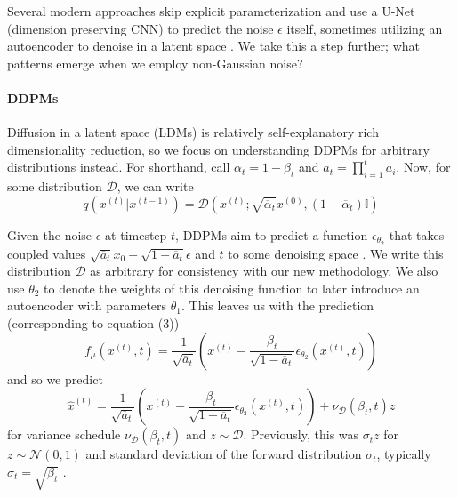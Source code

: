 \documentclass[10pt,twocolumn,letterpaper]{article}
\begin{document}
Several modern approaches \cite{DBLP:journals/corr/abs-2011-13456, DBLP:journals/corr/abs-2006-11239, DBLP:journals/corr/abs-2010-02502,DBLP:journals/corr/abs-2102-09672} skip explicit parameterization and use a U-Net (dimension preserving CNN) \cite{DBLP:journals/corr/RonnebergerFB15} to predict the noise $\epsilon$ itself, sometimes utilizing an autoencoder to denoise in a latent space \cite{DBLP:journals/corr/abs-2112-10752}. We take this a step further; what patterns emerge when we employ non-Gaussian noise?

\paragraph{\textbf{DDPMs}} Diffusion in a latent space (LDMs) is relatively self-explanatory rich dimensionality reduction, so we focus on understanding DDPMs for arbitrary distributions instead. For shorthand, call $\alpha_t=1-\beta_t$ and $\overline{a_t}=\prod_{i=1}^t a_i$. Now, for some distribution $\mathcal{D}$, we can write
\begin{equation}
    q(x^{(t)}|x^{(t-1)})=\mathcal{D}(x^{(t)};\sqrt{\overline{\alpha}_t}x^{(0)},(1-\overline{\alpha}_t)\mathbb{I})
\end{equation}

Given the noise $\epsilon$ at timestep $t$, DDPMs aim to predict a function $\epsilon_{\theta_2}$ that takes coupled values $\sqrt{\overline{a}_t}x_0+\sqrt{1-\overline{a}_t}\epsilon$ and $t$ to some denoising space \cite{DBLP:journals/corr/abs-2006-11239, DBLP:journals/corr/abs-2102-09672}. We write this distribution $\mathcal{D}$ as arbitrary for consistency with our new methodology. We also use $\theta_2$ to denote the weights of this denoising function to later introduce an autoencoder with parameters $\theta_1$. This leaves us with the prediction (corresponding to equation (3))
\begin{equation}
    f_{\mu}(x^{(t)},t)=\frac{1}{\sqrt{\overline{a}_t}}\left( x^{(t)}-\frac{\beta_t}{\sqrt{1-\overline{a}_t}}\epsilon_{\theta_2}(x^{(t)},t) \right)
\end{equation}
and so we predict
\begin{equation}
    \hat{x}^{(t)}=\frac{1}{\sqrt{\overline{a}_t}}\left( x^{(t)}-\frac{\beta_t}{\sqrt{1-\overline{a}_t}}\epsilon_{\theta_2}(x^{(t)},t) \right) + \nu_{\mathcal{D}}(\beta_t,t) z
\end{equation}
for variance schedule $\nu_{\mathcal{D}}(\beta_t,t)$ and $z\sim \mathcal{D}$. Previously, this was $\sigma_t z$ for $z\sim \mathcal{N}(0,1)$ and standard deviation of the forward distribution $\sigma_t$, typically $\sigma_t=\sqrt{\beta_t}$ \cite{DBLP:journals/corr/abs-2006-11239}.
\end{document}
